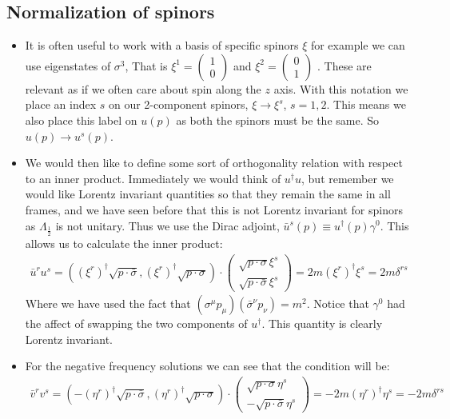 \documentclass[11pt]{article}
\numberwithin{equation}{section}
\begin{document}
\subsection{Normalization of spinors}
\begin{itemize}
  \item It is often useful to work with a basis of specific spinors $\xi$ for example we can use eigenstates of $\sigma^{3}$, That is $\xi^{1} = \begin{pmatrix}
    1 \\
    0
  \end{pmatrix}$ and $\xi^{2} = \begin{pmatrix}
    0 \\
    1
  \end{pmatrix}$ . These are relevant as if we often care about spin along the $z$ axis. With this notation we place an index $s$ on our 2-component spinors, $\xi \rightarrow \xi^{s}$, $s=1,2$. This means we also place this label on $u(p)$ as both the spinors must be the same. So $u(p)\rightarrow u^{s}(p)$. 

  \item We would then like to define some sort of orthogonality relation with respect to an inner product. Immediately we would think of $u^{\dagger}u$, but remember we would like Lorentz invariant quantities so that they remain the same in all frames, and we have seen before that this is not Lorentz invariant for spinors as $\Lambda_{\frac{1}{2}}$ is not unitary. Thus we use the Dirac adjoint, $\bar{u}^s(p) \equiv u^{\dagger}(p)\gamma^{0}$. This allows us to calculate the inner product:
  \begin{align}
      \bar{u}^{r}u^{s} = ((\xi^{r})^{\dagger}\sqrt{p \cdot \bar{\sigma}},(\xi^r)^{\dagger}\sqrt{p \cdot \sigma}) \cdot \begin{pmatrix}
       \sqrt{p \cdot \sigma}\xi^s \\
        \sqrt{p \cdot \bar{\sigma}}\xi^s 
       \end{pmatrix} = 2m(\xi^r)^{\dagger}\xi^s = 2m\delta^{rs}
    \end{align}  
    Where we have used the fact that $(\sigma^{\mu}p_{\mu})(\bar{\sigma}^{\nu}p_{\nu}) =m^2$. Notice that $\gamma^{0}$ had the affect of swapping the two components of $u^{\dagger}$. This quantity is clearly Lorentz invariant.

    \item For the negative frequency solutions we can see that the condition will be:
    \begin{align}
      \bar{v}^{r}v^{s} = (-(\eta^{r})^{\dagger}\sqrt{p \cdot \bar{\sigma}},(\eta^r)^{\dagger}\sqrt{p \cdot \sigma}) \cdot \begin{pmatrix}
       \sqrt{p \cdot \sigma}\eta^s \\
        -\sqrt{p \cdot \bar{\sigma}}\eta^s 
       \end{pmatrix} = -2m(\eta^r)^{\dagger}\eta^s = -2m\delta^{rs}
    \end{align}
    

\end{itemize}
\end{document}
